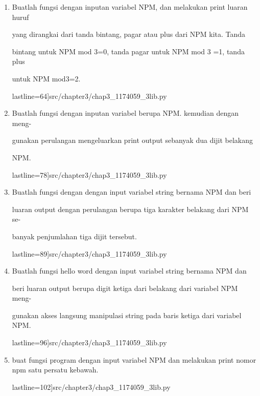 \begin{enumerate}

    \item Buatlah fungsi dengan inputan variabel NPM, dan melakukan print luaran huruf

    yang dirangkai dari tanda bintang, pagar atau plus dari NPM kita. Tanda

    bintang untuk NPM mod 3=0, tanda pagar untuk NPM mod 3 =1, tanda plus

    untuk NPM mod3=2.

 lastline=64]{src/chapter3/chap3_1174059_3lib.py}



    \item Buatlah fungsi dengan inputan variabel berupa NPM. kemudian dengan meng-

    gunakan perulangan mengeluarkan print output sebanyak dua dijit belakang

    NPM.

 lastline=78]{src/chapter3/chap3_1174059_3lib.py}



    \item Buatlah fungsi dengan dengan input variabel string bernama NPM dan beri

    luaran output dengan perulangan berupa tiga karakter belakang dari NPM se-

    banyak penjumlahan tiga dijit tersebut.

 lastline=89]{src/chapter3/chap3_1174059_3lib.py}



    \item Buatlah fungsi hello word dengan input variabel string bernama NPM dan

    beri luaran output berupa digit ketiga dari belakang dari variabel NPM meng-

    gunakan akses langsung manipulasi string pada baris ketiga dari variabel NPM.

 lastline=96]{src/chapter3/chap3_1174059_3lib.py}



    \item buat fungsi program dengan input variabel NPM dan melakukan print nomor npm satu persatu kebawah.

 lastline=102]{src/chapter3/chap3_1174059_3lib.py}




\end{enumerate}

